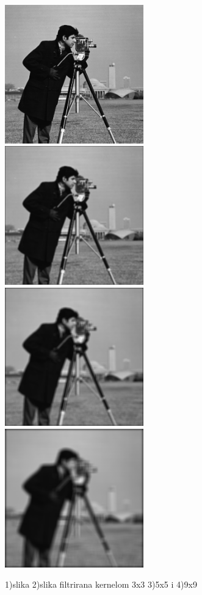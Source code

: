 \documentclass[a4paper,12pt,titlepage]{article}
\begin{document}
\begin{figure}[ht!]
\centering
\includegraphics[width=60mm]{img/img.png}
\includegraphics[width=60mm]{img/imgAvg3.png}
\includegraphics[width=60mm]{img/imgAvg5.png}
\includegraphics[width=60mm]{img/imgAvg9.png}
\caption{1)slika 2)slika filtrirana kernelom 3x3 3)5x5 i 4)9x9}
\label{overflow}
\end{figure}
\end{document}
